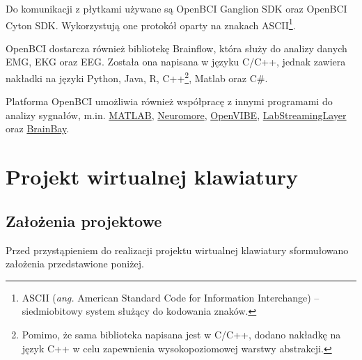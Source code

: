 \documentclass[skorowidz,skroty]{dyplomWEZUT}
\begin{document}
Do komunikacji z płytkami używane są OpenBCI Ganglion SDK oraz OpenBCI Cyton SDK. Wykorzystują one protokół oparty na znakach ASCII\footnote{ASCII (\textit{ang.} American Standard Code for Information Interchange) -- siedmiobitowy system służący do kodowania znaków.}.

OpenBCI dostarcza również bibliotekę Brainflow, która służy do analizy danych EMG, EKG oraz EEG\cite{markiv_software_brainflow}. Została ona napisana w języku C/C++, jednak zawiera nakładki na języki Python, Java, R, C++\footnote{Pomimo, że sama biblioteka napisana jest w C/C++, dodano nakładkę na język C++ w celu zapewnienia wysokopoziomowej warstwy abstrakcji.}, Matlab oraz C\#.

Platforma OpenBCI umożliwia również współpracę z innymi programami do analizy sygnałów, m.in. \href{https://www.mathworks.com/products/matlab.html}{MATLAB}, \href{https://www.neuromore.com/}{Neuromore}, \href{http://openvibe.inria.fr/}{OpenVIBE}, \href{https://github.com/sccn/labstreaminglayer}{LabStreamingLayer} oraz \href{http://www.shifz.org/brainbay/}{BrainBay}.


\chapter{Projekt wirtualnej klawiatury}
\section{Założenia projektowe}
Przed przystąpieniem do realizacji projektu wirtualnej klawiatury sformułowano założenia przedstawione poniżej.
\end{document}
